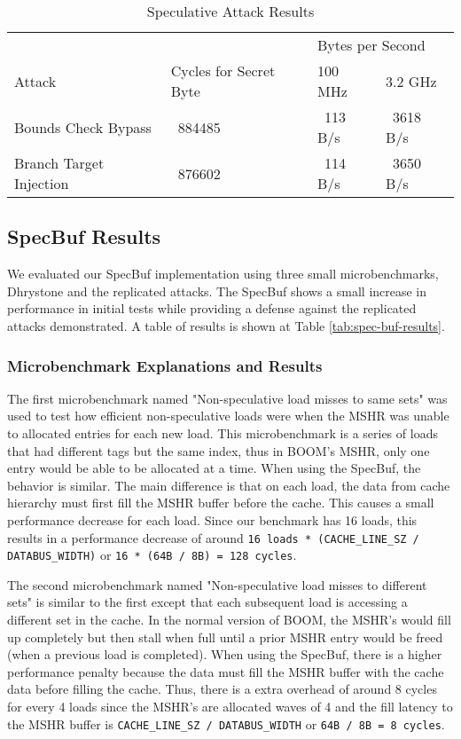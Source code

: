 \begin{table}
\centering
\caption{Speculative Attack Results}
\label{tab:spec-attack-results}
\begin{tabular}{@{} *4l @{}} \toprule
    &                        & \multicolumn{2}{l}{Bytes per Second} \\
    Attack                  & Cycles for Secret Byte &           100 MHz &   3.2 GHz \\ \midrule
    Bounds Check Bypass     &                ~884485 &          ~113 B/s & ~3618 B/s \\
    Branch Target Injection &                ~876602 &          ~114 B/s & ~3650 B/s \\ \bottomrule
\end{tabular}
\end{table}

\subsection{SpecBuf Results}

We evaluated our SpecBuf implementation using three small microbenchmarks, Dhrystone and the 
replicated attacks. The SpecBuf shows a small increase in performance in initial tests while providing
a defense against the replicated attacks demonstrated. A table of results is shown at Table \ref{tab:spec-buf-results}.

\subsubsection{Microbenchmark Explanations and Results}

The first microbenchmark named "Non-speculative load misses to same sets" was used to test how efficient non-speculative loads
were when the MSHR was unable to allocated entries for each new load. This microbenchmark is a series of loads that had different
tags but the same index, thus in BOOM's MSHR, only one entry would be able to be allocated at a time. When using the SpecBuf, the 
behavior is similar. The main difference is that on each load, the data from cache hierarchy must first fill the MSHR buffer
before the cache. This causes a small performance decrease for each load. Since our benchmark has 16 loads, this results in a performance decrease of around
{\tt 16 loads * (CACHE\_LINE\_SZ / DATABUS\_WIDTH)} or {\tt 16 * (64B / 8B) = 128 cycles}.

The second microbenchmark named "Non-speculative load misses to different sets" is similar to the first except that each subsequent
load is accessing a different set in the cache. In the normal version of BOOM, the MSHR's would fill up completely but then stall 
when full until a prior MSHR entry would be freed (when a previous load is completed). When using the SpecBuf, there is a
higher performance penalty because the data must fill the MSHR buffer with the cache data before filling the cache. Thus, there 
is a extra overhead of around 8 cycles for every 4 loads since the MSHR's are allocated waves of 4 and the fill latency to the MSHR
buffer is {\tt CACHE\_LINE\_SZ / DATABUS\_WIDTH} or {\tt 64B / 8B = 8 cycles}.

